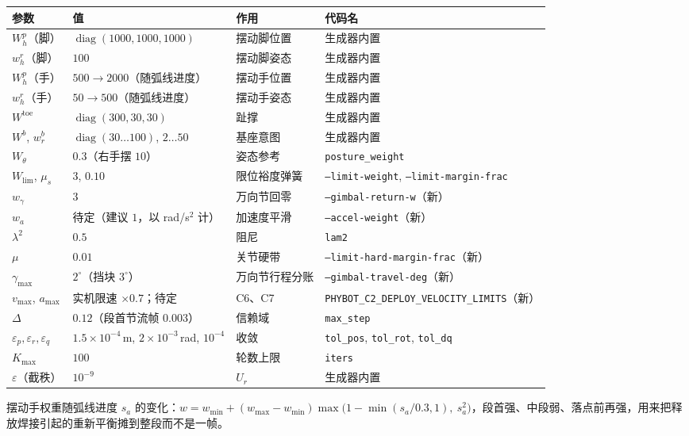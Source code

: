 \documentclass[11pt]{article}
\newcommand{\code}[1]{\texttt{\small #1}}
\DeclareMathOperator{\diag}{diag}
\begin{document}
\begin{center}\footnotesize
\begin{tabular}{@{}llll@{}}
\toprule
参数 & 值 & 作用 & 代码名 \\
\midrule
$W^p_h$（脚） & $\diag(1000,1000,1000)$ & 摆动脚位置 & 生成器内置 \\
$w^r_h$（脚） & $100$ & 摆动脚姿态 & 生成器内置 \\
$W^p_h$（手） & $500\to2000$（随弧线进度） & 摆动手位置 & 生成器内置 \\
$w^r_h$（手） & $50\to500$（随弧线进度） & 摆动手姿态 & 生成器内置 \\
$W^{\mathrm{toe}}$ & $\diag(300,30,30)$ & 趾撑 & 生成器内置 \\
$W^b$, $w^b_r$ & $\diag(30\ldots100)$, $2\ldots50$ & 基座意图 & 生成器内置 \\
$W_\theta$ & $0.3$（右手摆 $10$） & 姿态参考 & \code{posture\_weight} \\
$W_{\mathrm{lim}}$, $\mu_s$ & $3$, $0.10$ & 限位裕度弹簧 & \code{--limit-weight}, \code{--limit-margin-frac} \\
$w_\gamma$ & $3$ & 万向节回零 & \code{--gimbal-return-w}（新） \\
$w_a$ & 待定（建议 $1$，以 rad/s$^2$ 计） & 加速度平滑 & \code{--accel-weight}（新） \\
$\lambda^2$ & $0.5$ & 阻尼 & \code{lam2} \\
$\mu$ & $0.01$ & 关节硬带 & \code{--limit-hard-margin-frac}（新） \\
$\gamma_{\max}$ & $2^\circ$（挡块 $3^\circ$） & 万向节行程分账 & \code{--gimbal-travel-deg}（新） \\
$v_{\max}$, $a_{\max}$ & 实机限速 $\times0.7$；待定 & C6、C7 & \code{PHYBOT\_C2\_DEPLOY\_VELOCITY\_LIMITS}（新） \\
$\Delta$ & $0.12$（段首节流帧 $0.003$） & 信赖域 & \code{max\_step} \\
$\varepsilon_p,\varepsilon_r,\varepsilon_q$ & $1.5\times10^{-4}$\,m, $2\times10^{-3}$\,rad, $10^{-4}$ & 收敛 & \code{tol\_pos}, \code{tol\_rot}, \code{tol\_dq} \\
$K_{\max}$ & $100$ & 轮数上限 & \code{iters} \\
$\varepsilon$（截秩） & $10^{-9}$ & $U_r$ & 生成器内置 \\
\bottomrule
\end{tabular}
\end{center}

摆动手权重随弧线进度 $s_a$ 的变化：$w=w_{\min}+(w_{\max}-w_{\min})\max\bigl(1-\min(s_a/0.3,1),\ s_a^2\bigr)$，段首强、中段弱、落点前再强，用来把释放焊接引起的重新平衡摊到整段而不是一帧。
\end{document}
